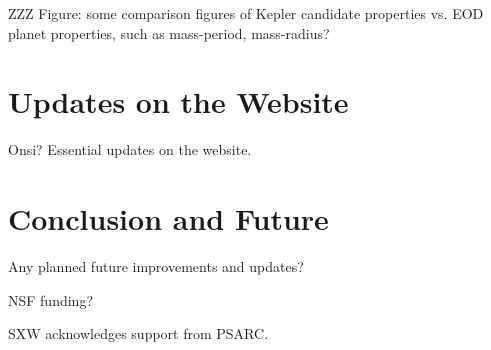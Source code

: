 \documentclass[11pt,preprint]{aastex}
\begin{document}
\begin{CJK*}{UTF8}{gbsn}
ZZZ Figure: some comparison figures of Kepler candidate properties vs. EOD
planet properties, such as mass-period, mass-radius?


\section{Updates on the Website}\label{sec:website}

Onsi? Essential updates on the website.


\section{Conclusion and Future}\label{sec:conclusion}

Any planned future improvements and updates?


\acknowledgments

NSF funding?

SXW acknowledges support from PSARC.





\clearpage


\end{CJK*}
\end{document}
